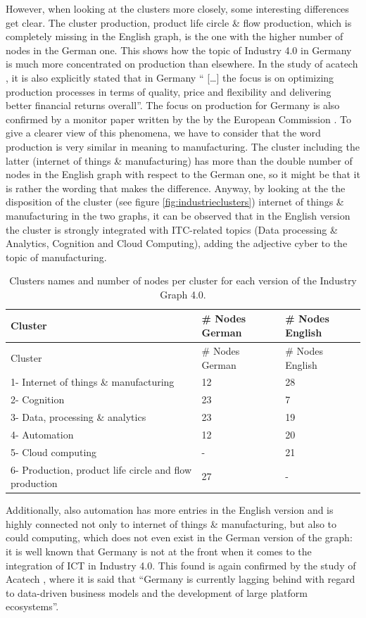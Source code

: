 \documentclass[]{book}
\begin{document}
However, when looking at the clusters more closely, some interesting
differences get clear. The cluster production, product life circle \&
flow production, which is completely missing in the English graph, is
the one with the higher number of nodes in the German one. This shows
how the topic of Industry 4.0 in Germany is much more concentrated on
production than elsewhere. In the study of acatech
\citep{kagermann2006industry}, it is also explicitly stated that in
Germany `` {[}\ldots{}{]} the focus is on optimizing production
processes in terms of quality, price and flexibility and delivering
better financial returns overall''. The focus on production for Germany
is also confirmed by a monitor paper written by the by the European
Commission \citep{industrie2016eu}. To give a clearer view of this
phenomena, we have to consider that the word production is very similar
in meaning to manufacturing. The cluster including the latter (internet
of things \& manufacturing) has more than the double number of nodes in
the English graph with respect to the German one, so it might be that it
is rather the wording that makes the difference. Anyway, by looking at
the the disposition of the cluster (see figure
\ref{fig:industrieclusters}) internet of things \& manufacturing in the
two graphs, it can be observed that in the English version the cluster
is strongly integrated with ITC-related topics (Data processing \&
Analytics, Cognition and Cloud Computing), adding the adjective cyber to
the topic of manufacturing.

\begin{longtable}[]{@{}lll@{}}
\caption{\label{tab:industrietab3} Clusters names and number of nodes per
cluster for each version of the Industry Graph 4.0.}\tabularnewline
\toprule
Cluster & \# Nodes German & \# Nodes English\tabularnewline
\midrule
\endfirsthead
\toprule
Cluster & \# Nodes German & \# Nodes English\tabularnewline
\midrule
\endhead
1- Internet of things \& manufacturing & 12 & 28\tabularnewline
2- Cognition & 23 & 7\tabularnewline
3- Data, processing \& analytics & 23 & 19\tabularnewline
4- Automation & 12 & 20\tabularnewline
5- Cloud computing & - & 21\tabularnewline
6- Production, product life circle and flow production & 27 &
-\tabularnewline
\bottomrule
\end{longtable}

Additionally, also automation has more entries in the English version
and is highly connected not only to internet of things \& manufacturing,
but also to could computing, which does not even exist in the German
version of the graph: it is well known that Germany is not at the front
when it comes to the integration of ICT in Industry 4.0. This found is
again confirmed by the study of Acatech \citep{kagermann2006industry},
where it is said that ``Germany is currently lagging behind with regard
to data-driven business models and the development of large platform
ecosystems''.
\end{document}
